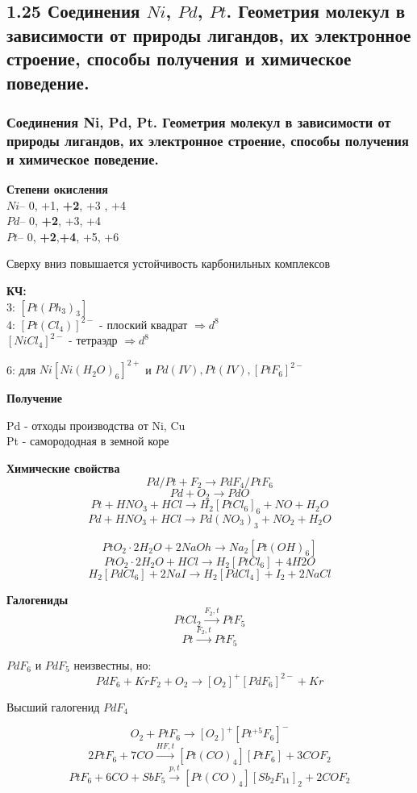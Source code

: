 
\subsection{1.25 Соединения $Ni$, $Pd$, $Pt$. Геометрия молекул в зависимости от природы лигандов, их электронное строение, способы получения и химическое поведение.}
\subsubsection*{ Соединения Ni, Pd, Pt. Геометрия молекул в зависимости от природы лигандов, их электронное строение, способы получения и химическое поведение.}

\textbf{Степени окисления}\\
$Ni$-- 0, +1, \textbf{+2}, +3 , +4\\
$Pd$-- 0, \textbf{+2}, +3, +4\\
$Pt$-- 0, \textbf{+2},\textbf{+4}, +5, +6

Сверху вниз повышается устойчивость карбонильных комплексов

\textbf{КЧ:}\\
3: $[Pt(Ph_3)_3]$\\
4:  $[Pt(Cl_4)]^{2-}$ - плоский квадрат $\Rightarrow d^8$\\
$[NiCl_4]^{2-}$ - тетраэдр $\Rightarrow d^8$

6: для $Ni[Ni(H_2O)_6]^{2+}$ и $Pd(IV), Pt(IV), [PtF_6]^{2-}$

\textbf{Получение}

Pd - отходы производства от Ni, Cu\\
Pt - саморододная в земной коре

\textbf{Химические свойства}\\
$$Pd/Pt + F_2 \rightarrow PdF_4 / PtF_6$$
$$Pd + O_2 \rightarrow PdO$$
$$Pt + HNO_3 + HCl \rightarrow H_2[PtCl_6]_6 + NO + H_2O$$
$$Pd + HNO_3 + HCl \rightarrow Pd(NO_3)_3 + NO_2 + H_2O$$

$$PtO_2\cdot 2H_2O + 2NaOh \rightarrow Na_2[Pt(OH)_6]$$
$$PtO_2\cdot 2H_2O  + HCl \rightarrow H_2[PtCl_6] + 4H2O$$
$$H_2[PdCl_6] + 2NaI \rightarrow H_2[PdCl_4] + I_2 + 2NaCl$$

\textbf{Галогениды}
$$PtCl_2 \xrightarrow{F_2, t} PtF_5$$
$$Pt \xrightarrow{F_2,t} PtF_5$$

$PdF_6$ и $PdF_5$ неизвестны, но:
$$PdF_6 + KrF_2 + O_2 \rightarrow  [O_2]^+[PdF_6]^{2-} + Kr$$

Высший галогенид $PdF_4$

$$O_2 + PtF_6 \rightarrow [O_2]^+[Pt^{+5}F_6]^-$$
$$2PtF_6 + 7CO \xrightarrow{HF, t} [Pt(CO)_4][PtF_6] + 3COF_2$$
$$PtF_6 + 6CO + SbF_5  \xrightarrow{p,t} [Pt(CO)_4][Sb_2F_{11}]_2 + 2COF_2$$

